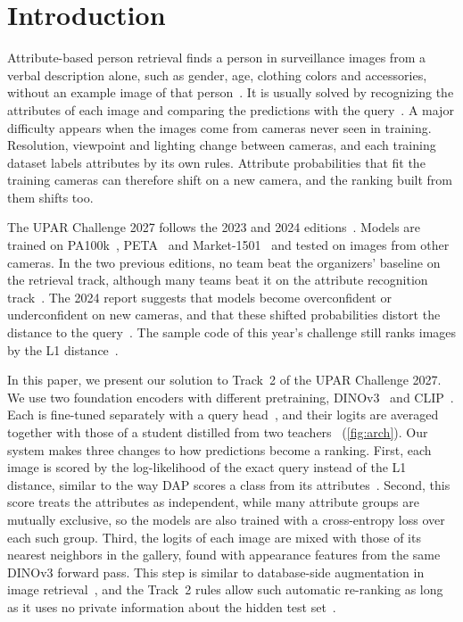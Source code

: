 \documentclass[10pt,twocolumn,letterpaper]{article}
\begin{document}
\section{Introduction}
\label{sec:intro}

Attribute-based person retrieval finds a person in surveillance images from a verbal description alone, such as gender, age, clothing colors and accessories, without an example image of that person~\cite{upar}. It is usually solved by recognizing the attributes of each image and comparing the predictions with the query~\cite{upar,specker21}. A major difficulty appears when the images come from cameras never seen in training. Resolution, viewpoint and lighting change between cameras, and each training dataset labels attributes by its own rules. Attribute probabilities that fit the training cameras can therefore shift on a new camera, and the ranking built from them shifts too.

The UPAR Challenge 2027 follows the 2023 and 2024 editions~\cite{upar23,upar24}. Models are trained on PA100k~\cite{pa100k}, PETA~\cite{peta} and Market-1501~\cite{market,marketattr} and tested on images from other cameras. In the two previous editions, no team beat the organizers' baseline on the retrieval track, although many teams beat it on the attribute recognition track~\cite{upar23,upar24}. The 2024 report suggests that models become overconfident or underconfident on new cameras, and that these shifted probabilities distort the distance to the query~\cite{upar24}. The sample code of this year's challenge still ranks images by the L1 distance~\cite{starterkit}.

In this paper, we present our solution to Track~2 of the UPAR Challenge 2027. We use two foundation encoders with different pretraining, DINOv3~\cite{dinov3} and CLIP~\cite{clip}. Each is fine-tuned separately with a query head~\cite{q2l}, and their logits are averaged together with those of a student distilled from two teachers~\cite{hinton,patient} (\cref{fig:arch}). Our system makes three changes to how predictions become a ranking. First, each image is scored by the log-likelihood of the exact query instead of the L1 distance, similar to the way DAP scores a class from its attributes~\cite{dap}. Second, this score treats the attributes as independent, while many attribute groups are mutually exclusive, so the models are also trained with a cross-entropy loss over each such group. Third, the logits of each image are mixed with those of its nearest neighbors in the gallery, found with appearance features from the same DINOv3 forward pass. This step is similar to database-side augmentation in image retrieval~\cite{turcot,gordo}, and the Track~2 rules allow such automatic re-ranking as long as it uses no private information about the hidden test set~\cite{rules}.
\end{document}
